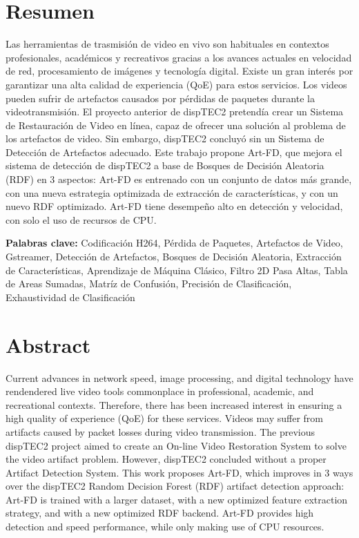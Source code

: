 \chapter*{Resumen}
\thispagestyle{empty}

Las herramientas de trasmisión de video en vivo son habituales en contextos profesionales, académicos y recreativos gracias a los avances actuales en velocidad de red, procesamiento de imágenes y tecnología digital. Existe un gran interés por garantizar una alta calidad de experiencia (QoE) para estos servicios. Los videos pueden sufrir de artefactos causados por pérdidas de paquetes durante la videotransmisión. El proyecto anterior de dispTEC2 pretendía crear un Sistema de Restauración de Video en línea, capaz de ofrecer una solución al problema de los artefactos de video. Sin embargo, dispTEC2 concluyó sin un Sistema de Detección de Artefactos adecuado. Este trabajo propone Art-FD, que mejora el sistema de detección de dispTEC2 a base de Bosques de Decisión Aleatoria (RDF) en 3 aspectos: Art-FD es entrenado con un conjunto de datos más grande, con una nueva estrategia optimizada de extracción de características, y con un nuevo RDF optimizado. Art-FD tiene desempeño alto en detección y velocidad, con solo el uso de recursos de CPU.
\bigskip

\textbf{Palabras clave:} Codificación H264, Pérdida de Paquetes, Artefactos de Video, Gstreamer, Detección de Artefactos, Bosques de Decisión Aleatoria, Extracción de Características, Aprendizaje de Máquina Clásico, Filtro 2D Pasa Altas, Tabla de Areas Sumadas, Matríz de Confusión, Precisión de Clasificación, Exhaustividad de Clasificación \thesisKeywords

\clearpage
\chapter*{Abstract}
\thispagestyle{empty}

Current advances in network speed, image processing, and digital technology have rendendered live video tools commonplace in professional, academic, and recreational contexts. Therefore, there has been increased interest in ensuring a high quality of experience (QoE) for these services. Videos may suffer from artifacts caused by packet losses during video transmission. The previous dispTEC2 project aimed to create an On-line Video Restoration System to solve the video artifact problem. However, dispTEC2 concluded without a proper Artifact Detection System. This work proposes Art-FD, which improves in 3 ways over the dispTEC2 Random Decision Forest (RDF) artifact detection approach: Art-FD is trained with a larger dataset, with a new optimized feature extraction strategy, and with a new optimized RDF backend. Art-FD provides high detection and speed performance, while only making use of CPU resources.

